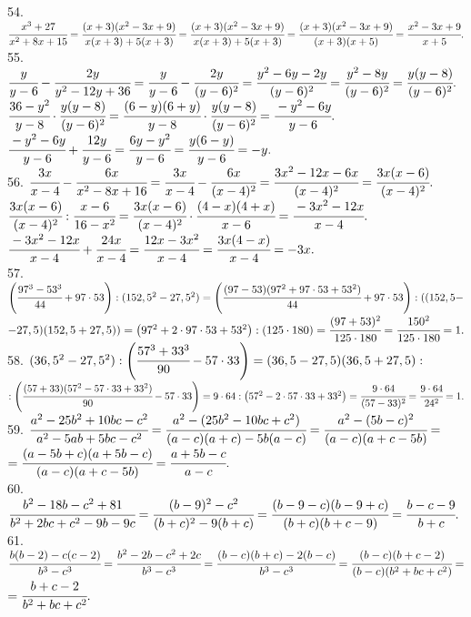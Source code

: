 54. $\cfrac{x^3+27}{x^2+8x+15}=\cfrac{(x+3)(x^2-3x+9)}{x(x+3)+5(x+3)}=\cfrac{(x+3)(x^2-3x+9)}{x(x+3)+5(x+3)}=\cfrac{(x+3)(x^2-3x+9)}{(x+3)(x+5)}=\cfrac{x^2-3x+9}{x+5}.$\\
55. $\cfrac{y}{y-6}-\cfrac{2y}{y^2-12y+36}=\cfrac{y}{y-6}-\cfrac{2y}{(y-6)^2}=\cfrac{y^2-6y-2y}{(y-6)^2}=\cfrac{y^2-8y}{(y-6)^2}=\cfrac{y(y-8)}{(y-6)^2}.$\\
$\cfrac{36-y^2}{y-8}\cdot\cfrac{y(y-8)}{(y-6)^2}=\cfrac{(6-y)(6+y)}{y-8}\cdot\cfrac{y(y-8)}{(y-6)^2}=\cfrac{-y^2-6y}{y-6}.$\\
$\cfrac{-y^2-6y}{y-6}+\cfrac{12y}{y-6}=\cfrac{6y-y^2}{y-6}=\cfrac{y(6-y)}{y-6}=-y.$\\
56. $\cfrac{3x}{x-4}-\cfrac{6x}{x^2-8x+16}=\cfrac{3x}{x-4}-\cfrac{6x}{(x-4)^2}=\cfrac{3x^2-12x-6x}{(x-4)^2}=\cfrac{3x(x-6)}{(x-4)^2}.$\\
$\cfrac{3x(x-6)}{(x-4)^2}:\cfrac{x-6}{16-x^2}=\cfrac{3x(x-6)}{(x-4)^2}\cdot\cfrac{(4-x)(4+x)}{x-6}=\cfrac{-3x^2-12x}{x-4}.$\\
$\cfrac{-3x^2-12x}{x-4}+\cfrac{24x}{x-4}=\cfrac{12x-3x^2}{x-4}=\cfrac{3x(4-x)}{x-4}=-3x.$\\
57. $\left(\cfrac{97^3-53^3}{44}+97\cdot53\right): (152,5^2-27,5^2)=
\left(\cfrac{(97-53)(97^2+97\cdot53+53^2)}{44}+97\cdot53\right):((152,5-$\\$-27,5)(152,5+27,5))=
\left(97^2+2\cdot97\cdot53+53^2\right):(125\cdot180)=\cfrac{(97+53)^2}{125\cdot180}=
\cfrac{150^2}{125\cdot180}=1.$\\
58. $(36,5^2-27,5^2): \left(\cfrac{57^3+33^3}{90}-57\cdot 33\right)=
(36,5-27,5)(36,5+27,5):$\\$:\left(\cfrac{(57+33)(57^2-57\cdot33+33^2)}{90}-57\cdot 33\right)=
9\cdot64:\left(57^2-2\cdot57\cdot33+33^2\right)=\cfrac{9\cdot64}{(57-33)^2}=\cfrac{9\cdot64}{24^2}=1.$\\
59. $\cfrac{a^2-25b^2+10bc-c^2}{a^2-5ab+5bc-c^2}=\cfrac{a^2-(25b^2-10bc+c^2)}{(a-c)(a+c)-5b(a-c)}
=\cfrac{a^2-(5b-c)^2}{(a-c)(a+c-5b)}=$\\$=\cfrac{(a-5b+c)(a+5b-c)}{(a-c)(a+c-5b)}=\cfrac{a+5b-c}{a-c}.$\\
60. $\cfrac{b^2-18b-c^2+81}{b^2+2bc+c^2-9b-9c}=\cfrac{(b-9)^2-c^2}{(b+c)^2-9(b+c)}=\cfrac{(b-9-c)(b-9+c)}{(b+c)(b+c-9)}=\cfrac{b-c-9}{b+c}.$\\
61. $\cfrac{b(b-2)-c(c-2)}{b^3-c^3}=\cfrac{b^2-2b-c^2+2c}{b^3-c^3}=\cfrac{(b-c)(b+c)-2(b-c)}{b^3-c^3}=\cfrac{(b-c)(b+c-2)}{(b-c)(b^2+bc+c^2)}=$\\$=\cfrac{b+c-2}{b^2+bc+c^2}.$\\
